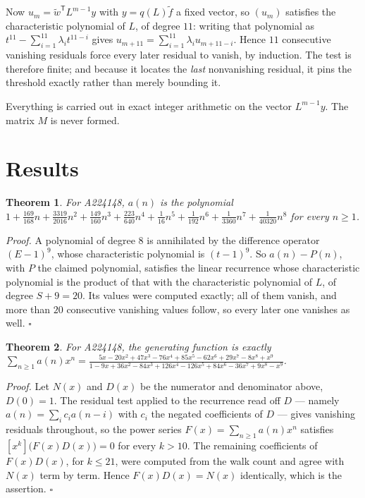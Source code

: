 \documentclass[11pt]{article}
\newtheorem{theorem}{Theorem}
\theoremstyle{definition}
\begin{document}
Now $u_m = \tilde w^{\mathsf T} L^{m-1} y$ with $y = q(L)\tilde f$ a fixed vector, so $(u_m)$ satisfies the characteristic polynomial of $L$, of degree $11$: writing that polynomial as $t^{11} - \sum_{i=1}^{11} \lambda_i t^{11-i}$ gives $u_{m+11} = \sum_{i=1}^{11} \lambda_i u_{m+11-i}$. Hence $11$ consecutive vanishing residuals force every later residual to vanish, by induction. The test is therefore finite; and because it locates the {\itshape last} nonvanishing residual, it pins the threshold exactly rather than merely bounding it.

Everything is carried out in exact integer arithmetic on the vector $L^{m-1}y$. The matrix $M$ is never formed.

\section{Results}

\begin{theorem} For A224148, $a(n)$ is the polynomial $1 + \frac{169}{168}n + \frac{3319}{2016}n^{2} + \frac{149}{160}n^{3} + \frac{223}{640}n^{4} + \frac{1}{16}n^{5} + \frac{1}{192}n^{6} + \frac{1}{3360}n^{7} + \frac{1}{40320}n^{8}$ for every $n \ge 1$.\end{theorem}

{\itshape Proof.} A polynomial of degree $8$ is annihilated by the difference operator $(E-1)^{9}$, whose characteristic polynomial is $(t-1)^{9}$. So $a(n) - P(n)$, with $P$ the claimed polynomial, satisfies the linear recurrence whose characteristic polynomial is the product of that with the characteristic polynomial of $L$, of degree $S + 9 = 20$. Its values were computed exactly; all of them vanish, and more than $20$ consecutive vanishing values follow, so every later one vanishes as well. $\square$

\begin{theorem} For A224148, the generating function is exactly $\sum_{n\ge 1} a(n)x^n = \frac{5x - 20x^{2} + 47x^{3} - 76x^{4} + 85x^{5} - 62x^{6} + 29x^{7} - 8x^{8} + x^{9}}{1 - 9x + 36x^{2} - 84x^{3} + 126x^{4} - 126x^{5} + 84x^{6} - 36x^{7} + 9x^{8} - x^{9}}$.\end{theorem}

{\itshape Proof.} Let $N(x)$ and $D(x)$ be the numerator and denominator above, $D(0)=1$. The residual test applied to the recurrence read off $D$ --- namely $a(n) = \sum_i c_i a(n-i)$ with $c_i$ the negated coefficients of $D$ --- gives vanishing residuals throughout, so the power series $F(x)=\sum_{n\ge 1}a(n)x^n$ satisfies $[x^k]\bigl(F(x)D(x)\bigr) = 0$ for every $k > 10$. The remaining coefficients of $F(x)D(x)$, for $k \le 21$, were computed from the walk count and agree with $N(x)$ term by term. Hence $F(x)D(x) = N(x)$ identically, which is the assertion. $\square$
\end{document}
